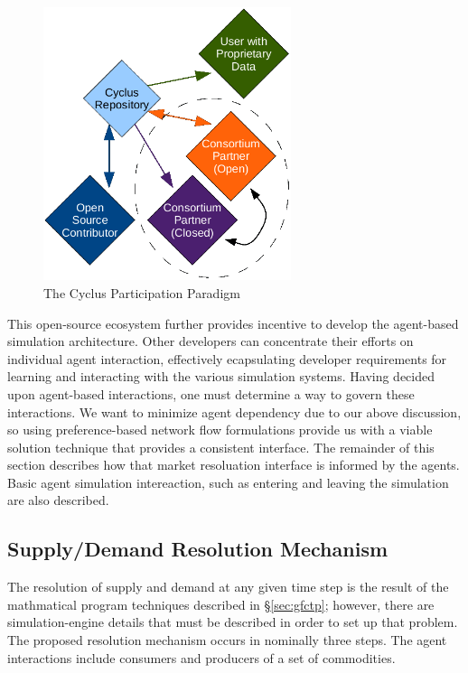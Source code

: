 \begin{figure}[htbp!]
  \begin{center}
    \includegraphics[height=8cm]{./chapters/research/community.png}
  \end{center}
  \caption{The Cyclus Participation Paradigm} 
  \label{fig:community}
\end{figure}

This open-source ecosystem further provides incentive to develop the agent-based
simulation architecture. Other developers can concentrate their efforts on
individual agent interaction, effectively ecapsulating developer requirements
for learning and interacting with the various simulation systems. Having decided
upon agent-based interactions, one must determine a way to govern these
interactions. We want to minimize agent dependency due to our above discussion,
so using preference-based network flow formulations provide us with a viable
solution technique that provides a consistent interface. The remainder of this
section describes how that market resoluation interface is informed by the
agents. Basic agent simulation intereaction, such as entering and leaving the
simulation are also described.

\subsection{Supply/Demand Resolution Mechanism}

The resolution of supply and demand at any given time step is the result of the
mathmatical program techniques described in \S\ref{sec:gfctp}; however, there
are simulation-engine details that must be described in order to set up that
problem. The proposed resolution mechanism occurs in nominally three steps. The
agent interactions include consumers and producers of a set of commodities.

